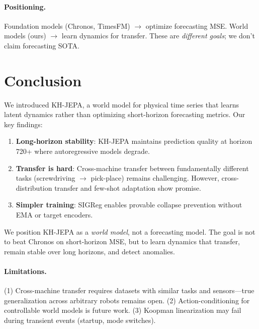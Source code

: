 \documentclass{article}
\begin{document}
\paragraph{Positioning.}
Foundation models (Chronos, TimesFM) $\rightarrow$ optimize forecasting MSE.
World models (ours) $\rightarrow$ learn dynamics for transfer.
These are \emph{different goals}; we don't claim forecasting SOTA.

\section{Conclusion}

We introduced KH-JEPA, a world model for physical time series that learns latent dynamics rather than optimizing short-horizon forecasting metrics. Our key findings:

\begin{enumerate}
    \item \textbf{Long-horizon stability}: KH-JEPA maintains prediction quality at horizon 720+ where autoregressive models degrade.
    \item \textbf{Transfer is hard}: Cross-machine transfer between fundamentally different tasks (screwdriving $\rightarrow$ pick-place) remains challenging. However, cross-distribution transfer and few-shot adaptation show promise.
    \item \textbf{Simpler training}: SIGReg enables provable collapse prevention without EMA or target encoders.
\end{enumerate}

We position KH-JEPA as a \emph{world model}, not a forecasting model. The goal is not to beat Chronos on short-horizon MSE, but to learn dynamics that transfer, remain stable over long horizons, and detect anomalies.

\paragraph{Limitations.} (1) Cross-machine transfer requires datasets with similar tasks and sensors—true generalization across arbitrary robots remains open. (2) Action-conditioning for controllable world models is future work. (3) Koopman linearization may fail during transient events (startup, mode switches).



\end{document}
